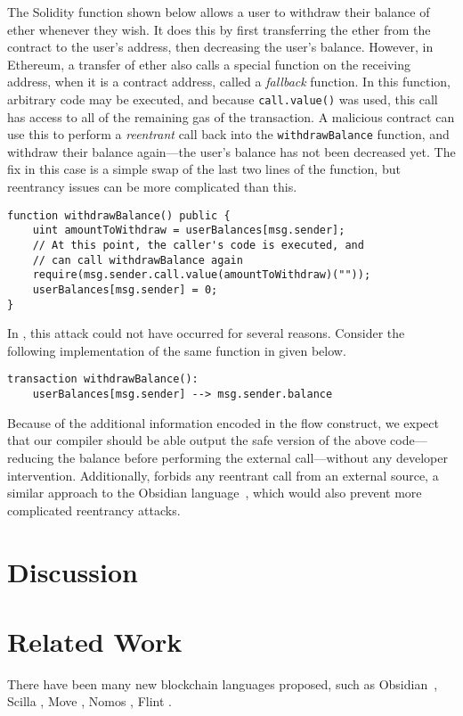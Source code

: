 \documentclass[dvipsnames, usenames, sigconf]{acmart}
\begin{document}
The Solidity function shown below allows a user to withdraw their balance of ether whenever they wish.
It does this by first transferring the ether from the contract to the user's address, then decreasing the user's balance.
However, in Ethereum, a transfer of ether also calls a special function on the receiving address, when it is a contract address, called a \emph{fallback} function.
In this function, arbitrary code may be executed, and because \lstinline{call.value()} was used, this call has access to all of the remaining gas of the transaction.
A malicious contract can use this to perform a \emph{reentrant} call back into the \lstinline{withdrawBalance} function, and withdraw their balance again---the user's balance has not been decreased yet.
The fix in this case is a simple swap of the last two lines of the function, but reentrancy issues can be more complicated than this.
\begin{lstlisting}[language=Solidity]
function withdrawBalance() public {
    uint amountToWithdraw = userBalances[msg.sender];
    // At this point, the caller's code is executed, and
    // can call withdrawBalance again
    require(msg.sender.call.value(amountToWithdraw)(""));
    userBalances[msg.sender] = 0;
}
\end{lstlisting}

In \langName, this attack could not have occurred for several reasons.
Consider the following implementation of the same function in \langName given below.
\begin{lstlisting}[language=flow]
transaction withdrawBalance():
    userBalances[msg.sender] --> msg.sender.balance
\end{lstlisting}
Because of the additional information encoded in the flow construct, we expect that our compiler should be able output the safe version of the above code---reducing the balance before performing the external call---without any developer intervention.
Additionally, \langName forbids any reentrant call from an external source, a similar approach to the Obsidian language~\cite{coblenz2019obsidian}, which would also prevent more complicated reentrancy attacks.

\section{Discussion}

\section{Related Work}
There have been many new blockchain languages proposed, such as Obsidian~\cite{coblenz2019obsidian}, Scilla , Move , Nomos , Flint . 
\end{document}
